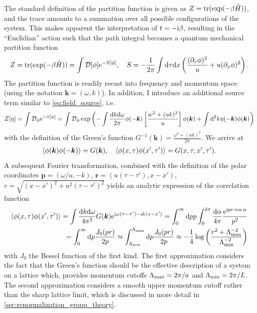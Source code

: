 The standard definition of the partition function is given as $Z={\rm tr}(\exp(-\beta \hat H))$, and the trace amounts to a summation over all possible configurations of the system.
This makes apparent the interpretation of $t=-\mathrm i \beta$, resulting in the ``Euclidian'' action such that the path integral becomes a quantum mechanical partition function
\begin{align}
    Z = {\rm tr}(\exp(-\beta \hat H)) = \int\mathcal D[\phi]\mathrm e^{-S[\phi]}
    ,\quad
    S = -\frac1{2\pi}\int\mathrm d\tau\mathrm d x\left(  \frac{(\partial_\tau\phi)^2}{u} + u(\partial_x\phi)^2 \right).
\end{align}
The partition function is readily recast into frequency and momentum space (using the notation ${\bm k}=(\omega, k)$).
In addition, I introduce an additional source term similar to \cref{eq:field_source}, i.e.
\begin{align}
    Z[\eta] = \int\mathcal D_\phi \mathrm e^{-S[\phi]} = \int\mathcal D_\phi \exp\left( -\int\frac{\mathrm d k\mathrm d\omega}{2\pi}\phi(-{\bm k})\left[ \frac{w^2+(uk)^2}{u} \right]\phi({\bm k}) +\int\mathrm d^2k\eta(-{\bm k})\phi({\bm k}) \right)
    \label{eq:full_partition_function}
\end{align}
with the definition of the Green's function $G^{-1}({\bm k})=\frac{\omega^2+(uk)^2}{2\pi}$.
We arrive at
\begin{align}
    \braket{\phi({\bm k})\phi(-{\bm k})} = G({\bm k})
    ,\quad
    \braket{\phi(x,\tau)\phi(x',\tau')} = G(x,\tau,x',\tau').
    \label{eq:KG_greens_functions_equality}
\end{align}
A subsequent Fourier transformation, combined with the definition of the polar coordinates ${\bm p}=(\omega/u,-k)$, ${\bm r} = (u(\tau-\tau'), x-x')$, $r = \sqrt{(x-x')^2+u^2(\tau-\tau')^2}$ yields an analytic expression of the correlation function
\begin{align}
    \braket{\phi(x,\tau)\phi(x',\tau')}
    = \int\frac{\mathrm d k\mathrm d\omega}{4\pi^2}G({\bm k})\mathrm e^{\mathrm i\omega(\tau-\tau')-\mathrm i k(x-x')}
    = \int_0^\infty\mathrm d pp\int_0^{2\pi}\frac{\mathrm d\alpha}{4\pi}\frac{\mathrm e^{\mathrm i pr\cos\alpha}}{p^2}
    \\
    = \int_0^\infty\mathrm d p\frac{J_0(pr)}{2p}
    \approx
    \int_{\Lambda_{\rm min}}^{\Lambda_{\rm max}}\mathrm d p \frac{J_0(pr)}{2p}
    \approx
    -\frac14\log\left( \frac{r^2+\Lambda_{\rm max}^{-2}}{\Lambda_{\rm min}^{-2}} \right)
    \label{eq:kg_correlations_approximation}
\end{align}
with $J_0$ the Bessel function of the first kind.
The first approximation considers the fact that the Green's function should be the effective description of a system on a lattice which, provides momentum cutoffs $\Lambda_{\rm max} = 2\pi/a$ and $\Lambda_{\rm min} = 2\pi/L$.
The second approximation considers a smooth upper momentum cutoff rather than the sharp lattice limit, which is discussed in more detail in \cref{sec:renormalization_group_theory}.

